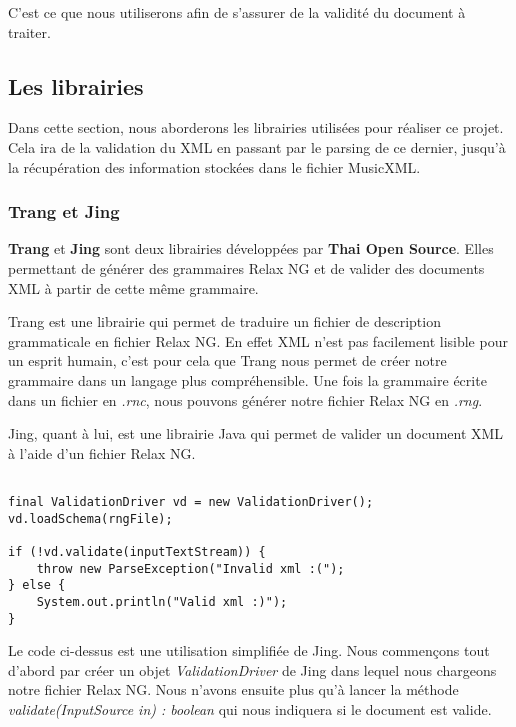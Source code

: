 \par
C'est ce que nous utiliserons afin de s'assurer de la validité du document à traiter.


\subsection{Les librairies}

Dans cette section, nous aborderons les librairies utilisées pour réaliser ce projet. Cela ira de la validation du XML en passant par le parsing de ce dernier, jusqu'à la récupération des information stockées dans le fichier MusicXML.


\subsubsection{Trang et Jing}

\textbf{Trang} \cite{trang} et \textbf{Jing} \cite{jing} sont deux librairies développées par \textbf{Thai Open Source}. Elles permettant de générer des grammaires Relax NG et de valider des documents XML à partir de cette même grammaire.

\par
Trang est une librairie qui permet de traduire un fichier de description grammaticale en fichier Relax NG. En effet XML n'est pas facilement lisible pour un esprit humain, c'est pour cela que Trang nous permet de créer notre grammaire dans un langage plus compréhensible. Une fois la grammaire écrite dans un fichier en \emph{.rnc}, nous pouvons générer notre fichier Relax NG en \emph{.rng}.

\par
Jing, quant à lui, est une librairie Java qui permet de valider un document XML à l'aide d'un fichier Relax NG.


\begin{lstlisting}[caption=Code java permettant de vérifier la validation d'un document XML]

final ValidationDriver vd = new ValidationDriver();
vd.loadSchema(rngFile);

if (!vd.validate(inputTextStream)) {
	throw new ParseException("Invalid xml :(");
} else {
    System.out.println("Valid xml :)");
}
\end{lstlisting}

\par
Le code ci-dessus est une utilisation simplifiée de Jing. Nous commençons tout d'abord par créer un objet \emph{ValidationDriver} de Jing dans lequel nous chargeons notre fichier Relax NG. Nous n'avons ensuite plus qu'à lancer la méthode \emph{validate(InputSource in) : boolean} qui nous indiquera si le document est valide.


